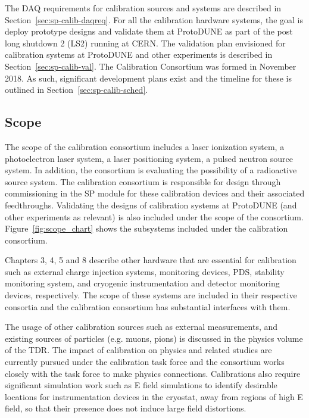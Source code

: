 The DAQ requirements for calibration sources and systems are described in Section~\ref{sec:sp-calib-daqreq}. For all the calibration hardware systems, the goal is deploy prototype designs and validate them at ProtoDUNE as part of the post long shutdown 2 (LS2) running  at CERN. The validation plan envisioned for calibration systems at ProtoDUNE and other experiments is described in Section~\ref{sec:sp-calib-val}. The Calibration Consortium was formed in November 2018. As such, significant development plans exist and the timeline for these is outlined in Section~\ref{sec:sp-calib-sched}.

\subsection{Scope}
\label{sec:sp-calib-ov-scope}


The scope of the calibration consortium includes a laser ionization system, a photoelectron laser system, a laser positioning system, a pulsed neutron source system. In addition, the consortium is evaluating the possibility of a radioactive source system. The calibration consortium is responsible for design through commissioning in the SP module for these calibration devices and their associated feedthroughs. Validating the designs of calibration systems at ProtoDUNE (and other experiments as relevant) is also included under the scope of the consortium. Figure~\ref{fig:scope_chart} shows the subsystems included under the calibration consortium. 

Chapters 3, 4, 5 and 8 describe other hardware that are essential for calibration such as  external charge injection systems,  monitoring devices, PDS,
stability monitoring system, and cryogenic instrumentation and detector monitoring devices, respectively. The scope of these systems are included in their respective consortia and the calibration consortium has substantial interfaces with them. 

The usage of other calibration sources such as external measurements, and existing sources of particles (e.g. muons, pions) is discussed in the physics volume of the TDR. The impact of calibration on physics and related studies are currently pursued under the calibration task force and the consortium works closely with the task force to make physics connections. Calibrations also require significant simulation work such as E field simulations to identify desirable locations for instrumentation devices in the cryostat, away from regions of high E field, so that their presence does not induce large field distortions. 

